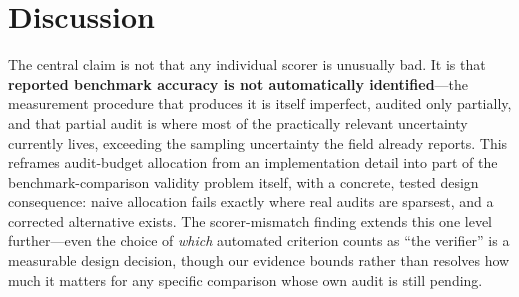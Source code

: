 \section{Discussion}
\label{sec:discussion}

The central claim is not that any individual scorer is unusually bad. It is
that \textbf{reported benchmark accuracy is not automatically identified}---the
measurement procedure that produces it is itself imperfect, audited only
partially, and that partial audit is where most of the practically
relevant uncertainty currently lives, exceeding the sampling uncertainty
the field already reports. This reframes audit-budget allocation from an
implementation detail into part of the benchmark-comparison validity
problem itself, with a concrete, tested design consequence: naive
allocation fails exactly where real audits are sparsest, and a corrected
alternative exists. The scorer-mismatch finding extends this one level
further---even the choice of \emph{which} automated criterion counts as
``the verifier'' is a measurable design decision, though our evidence
bounds rather than resolves how much it matters for any specific
comparison whose own audit is still pending.
